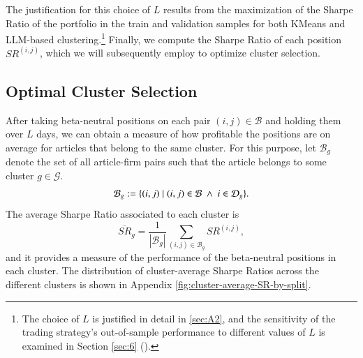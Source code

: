 The justification for this choice of $L$ results from the maximization of the Sharpe Ratio of the portfolio in the train and validation samples for both KMeans and LLM-based clustering.\footnote{ 
The choice of $L$ is justified in detail in \ref{sec:A2}, and the sensitivity of the trading strategy's out-of-sample performance to different values of $L$ is examined in Section \ref{sec:6} ().
}
Finally, we compute the Sharpe Ratio of each position $SR^{(i,j)}$, which we will subsequently employ to optimize cluster selection.
%

\subsection{Optimal Cluster Selection}

After taking beta-neutral positions on each pair $(i,j)\in\mathcal B$ and holding them over $L$ days, 
we can obtain a measure of how profitable the positions are on average for articles that belong to the same cluster.
For this purpose, let $\mathcal{B}_g$ denote the set of all article-firm pairs such that the article belongs to some cluster $g\in\mathcal G$. 
$$
\mathcal{B}_g:= \{(i,j) \mid (i,j)\in\mathcal{B} ~\wedge~ i \in \mathcal{D}_g \}
.
$$
The average Sharpe Ratio associated to each cluster is
$$
\overline{S R}_g=\frac{1}{\left|\mathcal{B}_g\right|} \sum_{(i,j) \in \mathcal{B}_g} S R^{(i,j)}
,
$$
and it provides a measure of the performance of the beta-neutral positions in each cluster. 
%
%
The distribution of cluster-average Sharpe Ratios across the different clusters is shown in Appendix \cref{fig:cluster-average-SR-by-split}. 


